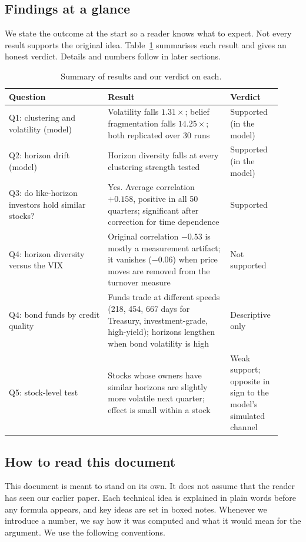 \subsection{Findings at a glance}

We state the outcome at the start so a reader knows what to expect. Not every result supports the original idea. Table~\ref{tab:glance} summarises each result and gives an honest verdict. Details and numbers follow in later sections.

\begin{table}[htbp]
\centering
\caption{Summary of results and our verdict on each.}
\label{tab:glance}
\small
\begin{tabular}{p{0.34\linewidth}p{0.42\linewidth}p{0.16\linewidth}}
\toprule
\textbf{Question} & \textbf{Result} & \textbf{Verdict}\\
\midrule
Q1: clustering and volatility (model) & Volatility falls $1.31\times$; belief fragmentation falls $14.25\times$; both replicated over 30 runs & Supported (in the model)\\
Q2: horizon drift (model) & Horizon diversity falls at every clustering strength tested & Supported (in the model)\\
Q3: do like-horizon investors hold similar stocks? & Yes. Average correlation $+0.158$, positive in all 50 quarters; significant after correction for time dependence & Supported\\
Q4: horizon diversity versus the VIX & Original correlation $-0.53$ is mostly a measurement artifact; it vanishes ($-0.06$) when price moves are removed from the turnover measure & Not supported\\
Q4: bond funds by credit quality & Funds trade at different speeds (218, 454, 667 days for Treasury, investment-grade, high-yield); horizons lengthen when bond volatility is high & Descriptive only\\
Q5: stock-level test & Stocks whose owners have similar horizons are slightly more volatile next quarter; effect is small within a stock & Weak support; opposite in sign to the model's simulated channel\\
\bottomrule
\end{tabular}
\end{table}

\subsection{How to read this document}

This document is meant to stand on its own. It does not assume that the reader has seen our earlier paper. Each technical idea is explained in plain words before any formula appears, and key ideas are set in boxed notes. Whenever we introduce a number, we say how it was computed and what it would mean for the argument. We use the following conventions.

